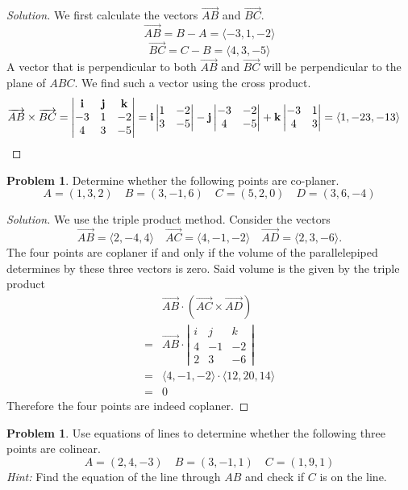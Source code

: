 \documentclass[12pt]{amsart}%
\theoremstyle{plain}
\theoremstyle{definition}
\newtheorem{prob}[theorem]{Problem}
\theoremstyle{special}
\newcommand{\sol}[1]{
{\begin{proof}[Solution]#1\end{proof}}
}
\newcommand{\Prob}[1]{\begin{tcolorbox}%
\begin{prob}
	#1
\end{prob}
\end{tcolorbox}	
}
\begin{document}
\sol{
We first calculate the vectors $\overrightarrow{AB}$ and $\overrightarrow{BC}$.
\[\overrightarrow{AB}=B-A=\langle-3,1,-2 \rangle\]
\[\overrightarrow{BC}=C-B=\langle 4,3,-5\rangle \]A vector that is perpendicular to both $\overrightarrow{AB}$ and $\overrightarrow{BC}$ will be perpendicular to the plane of $ABC$. We find such a vector using the cross product.
\begin{align*}&\overrightarrow{AB}\times\overrightarrow{BC}=\left|\begin{matrix}
	{\bf i}&{\bf j}&{\bf k}\\-3&1&-2\\4&3&-5
\end{matrix} \right|={\bf i}\left|\begin{matrix}
	1&-2\\3&-5
\end{matrix} \right|
-{\bf j}\left|\begin{matrix}
	-3&-2\\4&-5
\end{matrix}\right|+{\bf k}\left|
\begin{matrix}
	-3&1\\4&3
\end{matrix}
\right|=\langle 1,-23,-13\rangle\qedhere
\end{align*}
}
\Prob{
Determine whether the following points are co-planer.
\[A=(1,3,2)\quad B=(3,-1,6)\quad C=(5,2,0) \quad D=(3,6,-4)\]
}
\sol{We use the triple product method.
Consider the vectors
\[\overrightarrow{AB}=\langle 2,-4,4\rangle\quad\overrightarrow{AC}=\langle4,-1,-2\rangle \quad\overrightarrow{AD}=\langle2,3,-6\rangle.\]
The four points are coplaner if and only if the volume of the parallelepiped determines by these three vectors is zero.
Said volume is the given by the triple product
\begin{align*}&\overrightarrow{AB}\cdot(\overrightarrow{AC}\times \overrightarrow{AD})\\
=&\overrightarrow{AB}\cdot\left|\begin{matrix}
	i&j&k\\4&-1&-2\\2&3&-6
\end{matrix} \right|\\
=&\langle4,-1,-2\rangle\cdot\langle 12,20 ,14\rangle\\
=&0
  \end{align*}
 Therefore the four points are indeed coplaner.
}
\Prob{Use equations of lines to determine whether the following three points are colinear. 
\[A=(2,4,-3)\quad B=(3,-1,1)\quad C=(1,9,1)\]
\emph{Hint:} Find the equation of the line through $AB$ and check if $C$ is on the line.}
\end{document}
